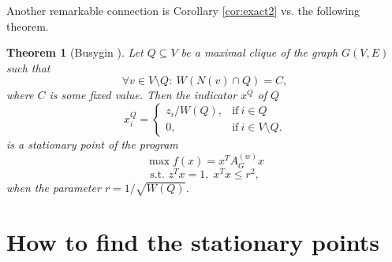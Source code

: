 \documentclass[11pt]{article}
\newtheorem{thm}{Theorem}
\begin{document}
Another remarkable connection is Corollary \ref{cor:exact2} vs. the following
theorem.
\begin{thm}[Busygin \cite{B02}]
\label{thm:exact4}
Let $Q \subseteq V$ be a maximal clique of the graph $G(V,E)$ such that
\[ \forall v \in V \setminus Q: \ W(N(v) \cap Q) = C, \]
where $C$ is some fixed value. Then the indicator $x^Q$ of $Q$
\[ x^Q_i = \left\{ \begin{array}{rl}
  z_i/W(Q), & \textrm{if} \ i \in Q \\
  0,        & \textrm{if} \ i \in V \setminus Q.
\end{array} \right. \]
is a stationary point of the program
\begin{equation}
\label{eq:cliquesphere1}
\max f(x) = x^T A^{(w)}_G x
\end{equation}
\[ \mbox{s.t. } z^T x = 1, \; x^T x \leq r^2, \]
when the parameter $r=1/\sqrt{W(Q)}$.
\end{thm}

\section{How to find the stationary points}
\end{document}
